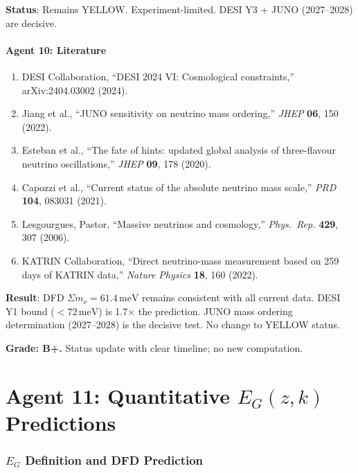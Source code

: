 \documentclass[11pt,a4paper]{article}
\begin{document}
\textbf{Status}: Remains YELLOW. Experiment-limited. DESI Y3 + JUNO (2027--2028) are decisive.

\subsection{Agent 10: Literature}

\begin{enumerate}
\item DESI Collaboration, ``DESI 2024 VI: Cosmological constraints,'' arXiv:2404.03002 (2024).
\item Jiang et al., ``JUNO sensitivity on neutrino mass ordering,'' \textit{JHEP} \textbf{06}, 150 (2022).
\item Esteban et al., ``The fate of hints: updated global analysis of three-flavour neutrino oscillations,'' \textit{JHEP} \textbf{09}, 178 (2020).
\item Capozzi et al., ``Current status of the absolute neutrino mass scale,'' \textit{PRD} \textbf{104}, 083031 (2021).
\item Lesgourgues, Pastor, ``Massive neutrinos and cosmology,'' \textit{Phys.\ Rep.} \textbf{429}, 307 (2006).
\item KATRIN Collaboration, ``Direct neutrino-mass measurement based on 259 days of KATRIN data,'' \textit{Nature Physics} \textbf{18}, 160 (2022).
\end{enumerate}

\begin{tcolorbox}[colback=yellow!10!white, colframe=yellow!60!black, title={Agent 10: $\Sigma m_\nu$ --- Remains YELLOW}]
\textbf{Result}: DFD $\Sigma m_\nu = 61.4\,\mathrm{meV}$ remains consistent with all current data. DESI Y1 bound ($< 72\,\mathrm{meV}$) is 1.7$\times$ the prediction. JUNO mass ordering determination (2027--2028) is the decisive test. No change to YELLOW status.

\textbf{Grade: B+.} Status update with clear timeline; no new computation.
\end{tcolorbox}


\part{Agent 11: Quantitative $E_G(z,k)$ Predictions}
\label{part:EG-predictions}

\section{$E_G$ Definition and DFD Prediction}
\end{document}
